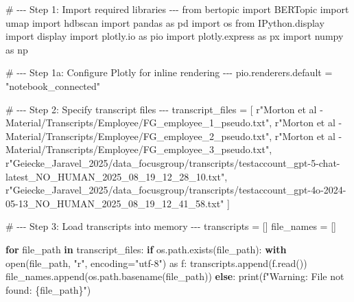 \documentclass[
  letterpaper,
  DIV=11,
  numbers=noendperiod]{scrartcl}
\newenvironment{Shaded}{\begin{snugshade}}{\end{snugshade}}
\newcommand{\BuiltInTok}[1]{\textcolor[rgb]{0.00,0.23,0.31}{#1}}
\newcommand{\CommentTok}[1]{\textcolor[rgb]{0.37,0.37,0.37}{#1}}
\newcommand{\ControlFlowTok}[1]{\textcolor[rgb]{0.00,0.23,0.31}{\textbf{#1}}}
\newcommand{\DecValTok}[1]{\textcolor[rgb]{0.68,0.00,0.00}{#1}}
\newcommand{\ImportTok}[1]{\textcolor[rgb]{0.00,0.46,0.62}{#1}}
\newcommand{\KeywordTok}[1]{\textcolor[rgb]{0.00,0.23,0.31}{\textbf{#1}}}
\newcommand{\NormalTok}[1]{\textcolor[rgb]{0.00,0.23,0.31}{#1}}
\newcommand{\OperatorTok}[1]{\textcolor[rgb]{0.37,0.37,0.37}{#1}}
\newcommand{\SpecialCharTok}[1]{\textcolor[rgb]{0.37,0.37,0.37}{#1}}
\newcommand{\SpecialStringTok}[1]{\textcolor[rgb]{0.13,0.47,0.30}{#1}}
\newcommand{\StringTok}[1]{\textcolor[rgb]{0.13,0.47,0.30}{#1}}
\newcommand{\VerbatimStringTok}[1]{\textcolor[rgb]{0.13,0.47,0.30}{#1}}
\begin{document}
\begin{Shaded}
\begin{Highlighting}[]
\CommentTok{\# {-}{-}{-} Step 1: Import required libraries {-}{-}{-}}
\ImportTok{from}\NormalTok{ bertopic }\ImportTok{import}\NormalTok{ BERTopic}
\ImportTok{import}\NormalTok{ umap}
\ImportTok{import}\NormalTok{ hdbscan}
\ImportTok{import}\NormalTok{ pandas }\ImportTok{as}\NormalTok{ pd}
\ImportTok{import}\NormalTok{ os}
\ImportTok{from}\NormalTok{ IPython.display }\ImportTok{import}\NormalTok{ display}
\ImportTok{import}\NormalTok{ plotly.io }\ImportTok{as}\NormalTok{ pio}
\ImportTok{import}\NormalTok{ plotly.express }\ImportTok{as}\NormalTok{ px}
\ImportTok{import}\NormalTok{ numpy }\ImportTok{as}\NormalTok{ np}

\CommentTok{\# {-}{-}{-} Step 1a: Configure Plotly for inline rendering {-}{-}{-}}
\NormalTok{pio.renderers.default }\OperatorTok{=} \StringTok{"notebook\_connected"}
 
\CommentTok{\# {-}{-}{-} Step 2: Specify transcript files {-}{-}{-}}
\NormalTok{transcript\_files }\OperatorTok{=}\NormalTok{ [}
    \VerbatimStringTok{r"Morton et al {-} Material/Transcripts/Employee/FG\_employee\_1\_pseudo}\DecValTok{.}\VerbatimStringTok{txt"}\NormalTok{,}
    \VerbatimStringTok{r"Morton et al {-} Material/Transcripts/Employee/FG\_employee\_2\_pseudo}\DecValTok{.}\VerbatimStringTok{txt"}\NormalTok{,}
    \VerbatimStringTok{r"Morton et al {-} Material/Transcripts/Employee/FG\_employee\_3\_pseudo}\DecValTok{.}\VerbatimStringTok{txt"}\NormalTok{,}
    \VerbatimStringTok{r"Geiecke\_Jaravel\_2025/data\_focusgroup/transcripts/testaccount\_gpt{-}5{-}chat{-}latest\_NO\_HUMAN\_2025\_08\_19\_12\_28\_10}\DecValTok{.}\VerbatimStringTok{txt"}\NormalTok{,}
    \VerbatimStringTok{r"Geiecke\_Jaravel\_2025/data\_focusgroup/transcripts/testaccount\_gpt{-}4o{-}2024{-}05{-}13\_NO\_HUMAN\_2025\_08\_19\_12\_41\_58}\DecValTok{.}\VerbatimStringTok{txt"}
\NormalTok{]}
 
\CommentTok{\# {-}{-}{-} Step 3: Load transcripts into memory {-}{-}{-}}
\NormalTok{transcripts }\OperatorTok{=}\NormalTok{ []}
\NormalTok{file\_names }\OperatorTok{=}\NormalTok{ []}

\ControlFlowTok{for}\NormalTok{ file\_path }\KeywordTok{in}\NormalTok{ transcript\_files:}
    \ControlFlowTok{if}\NormalTok{ os.path.exists(file\_path):}
        \ControlFlowTok{with} \BuiltInTok{open}\NormalTok{(file\_path, }\StringTok{"r"}\NormalTok{, encoding}\OperatorTok{=}\StringTok{"utf{-}8"}\NormalTok{) }\ImportTok{as}\NormalTok{ f:}
\NormalTok{            transcripts.append(f.read())}
\NormalTok{            file\_names.append(os.path.basename(file\_path))}
    \ControlFlowTok{else}\NormalTok{:}
        \BuiltInTok{print}\NormalTok{(}\SpecialStringTok{f"Warning: File not found: }\SpecialCharTok{\{}\NormalTok{file\_path}\SpecialCharTok{\}}\SpecialStringTok{"}\NormalTok{)}


\end{Highlighting}
\end{Shaded}
\end{document}
